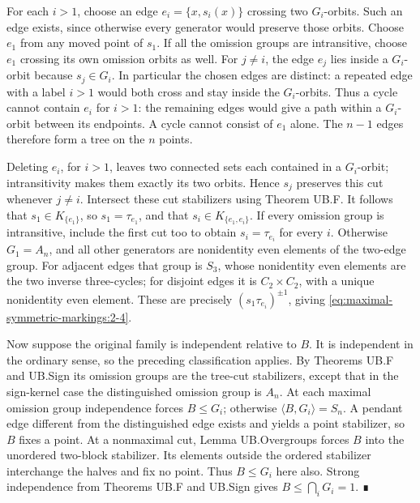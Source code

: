 For each \(i>1\), choose an edge \(e_i=\{x,s_i(x)\}\) crossing two \(G_i\)-orbits. Such an edge exists, since otherwise every generator would preserve those orbits. Choose \(e_1\) from any moved point of \(s_1\). If all the omission groups are intransitive, choose \(e_1\) crossing its own omission orbits as well. For \(j\ne i\), the edge \(e_j\) lies inside a \(G_i\)-orbit because \(s_j\in G_i\). In particular the chosen edges are distinct: a repeated edge with a label \(i>1\) would both cross and stay inside the \(G_i\)-orbits. Thus a cycle cannot contain \(e_i\) for \(i>1\): the remaining edges would give a path within a \(G_i\)-orbit between its endpoints. A cycle cannot consist of \(e_1\) alone. The \(n-1\) edges therefore form a tree on the \(n\) points.

Deleting \(e_i\), for \(i>1\), leaves two connected sets each contained in a \(G_i\)-orbit; intransitivity makes them exactly its two orbits. Hence \(s_j\) preserves this cut whenever \(j\ne i\). Intersect these cut stabilizers using Theorem UB.F. It follows that \(s_1\in K_{\{e_1\}}\), so \(s_1=\tau_{e_1}\), and that \(s_i\in K_{\{e_1,e_i\}}\). If every omission group is intransitive, include the first cut too to obtain \(s_i=\tau_{e_i}\) for every \(i\). Otherwise \(G_1=A_n\), and all other generators are nonidentity even elements of the two-edge group. For adjacent edges that group is \(S_3\), whose nonidentity even elements are the two inverse three-cycles; for disjoint edges it is \(C_2\times C_2\), with a unique nonidentity even element. These are precisely \((s_1\tau_{e_i})^{\pm1}\), giving \eqref{eq:maximal-symmetric-markings:2-4}.

Now suppose the original family is independent relative to \(B\). It is independent in the ordinary sense, so the preceding classification applies. By Theorems UB.F and UB.Sign its omission groups are the tree-cut stabilizers, except that in the sign-kernel case the distinguished omission group is \(A_n\). At each maximal omission group independence forces \(B\leq G_i\); otherwise \(\langle B,G_i\rangle=S_n\). A pendant edge different from the distinguished edge exists and yields a point stabilizer, so \(B\) fixes a point. At a nonmaximal cut, Lemma UB.Overgroups forces \(B\) into the unordered two-block stabilizer. Its elements outside the ordered stabilizer interchange the halves and fix no point. Thus \(B\leq G_i\) here also. Strong independence from Theorems UB.F and UB.Sign gives \(B\leq\bigcap_iG_i=1\). ∎

